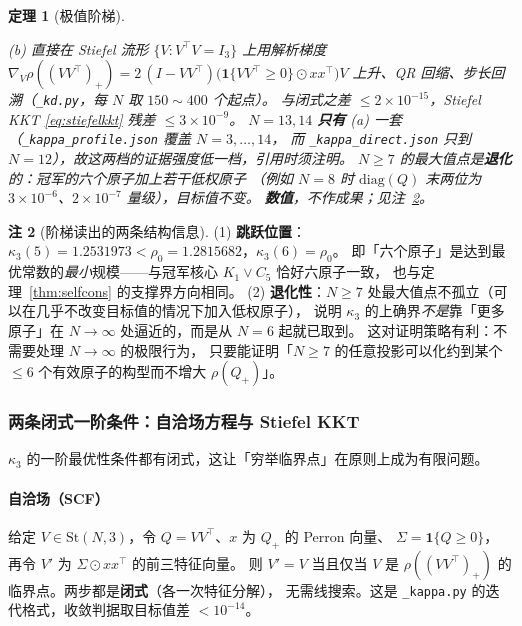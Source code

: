 \documentclass[UTF8,11pt]{ctexart}
\newtheorem{theorem}{定理}[section]
\theoremstyle{definition}
\newtheorem{remark}[theorem]{注}
\begin{document}
\begin{theorem}[极值阶梯]
\begin{enumerate}[label=(\roman*),leftmargin=2em]
(b) 直接在 Stiefel 流形 $\{V:V^\top V=I_3\}$ 上用解析梯度
$\nabla_V\rho((VV^\top)_+)=2\,(I-VV^\top)\bigl(\mathbf 1\{VV^\top\ge0\}\odot xx^\top\bigr)V$
上升、QR 回缩、步长回溯（\texttt{\_kd.py}，每 $N$ 取 $150\sim400$ 个起点）。
与闭式之差 $\le2\times10^{-15}$，Stiefel KKT \eqref{eq:stiefelkkt} 残差 $\le3\times10^{-9}$。
$N=13,14$ \textbf{只有} (a) 一套（\texttt{\_kappa\_profile.json} 覆盖 $N=3,\dots,14$，
而 \texttt{\_kappa\_direct.json} 只到 $N=12$），故这两档的证据强度低一档，引用时须注明。
$N\ge7$ 的最大值点是\textbf{退化}的：冠军的六个原子加上若干低权原子
（例如 $N=8$ 时 $\mathrm{diag}(Q)$ 末两位为 $3\times10^{-6}$、$2\times10^{-7}$ 量级），目标值不变。
\textbf{数值}，不作成果；见注~\ref{rmk:ladderinfo}。
\end{enumerate}
\end{theorem}

\begin{remark}[阶梯读出的两条结构信息]\label{rmk:ladderinfo}
(1) \textbf{跳跃位置}：$\kappa_3(5)=1.2531973<\rho_0=1.2815682$，$\kappa_3(6)=\rho_0$。
即「六个原子」是达到最优常数的\emph{最小}规模——与冠军核心 $K_1\vee C_5$ 恰好六原子一致，
也与定理~\ref{thm:selfcons} 的支撑界方向相同。
(2) \textbf{退化性}：$N\ge7$ 处最大值点不孤立（可以在几乎不改变目标值的情况下加入低权原子），
说明 $\kappa_3$ 的上确界\emph{不是}靠「更多原子」在 $N\to\infty$ 处逼近的，而是从 $N=6$ 起就已取到。
这对证明策略有利：不需要处理 $N\to\infty$ 的极限行为，
只要能证明「$N\ge7$ 的任意投影可以化约到某个 $\le6$ 个有效原子的构型而不增大 $\rho(Q_+)$」。
\end{remark}

\subsubsection{两条闭式一阶条件：自洽场方程与 Stiefel KKT}

$\kappa_3$ 的一阶最优性条件都有闭式，这让「穷举临界点」在原则上成为有限问题。

\paragraph{自洽场（SCF）}给定 $V\in\mathrm{St}(N,3)$，令 $Q=VV^\top$、$x$ 为 $Q_+$ 的 Perron 向量、
$\Sigma=\mathbf 1\{Q\ge0\}$，再令 $V'$ 为 $\Sigma\odot xx^\top$ 的前三特征向量。
则 $V'=V$ 当且仅当 $V$ 是 $\rho((VV^\top)_+)$ 的临界点。两步都是\textbf{闭式}（各一次特征分解），
无需线搜索。这是 \texttt{\_kappa.py} 的迭代格式，收敛判据取目标值差 $<10^{-14}$。
\end{document}
